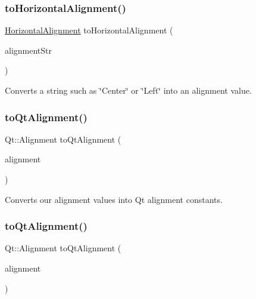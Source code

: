 \subsubsection{\texorpdfstring{to\+Horizontal\+Alignment()}{toHorizontalAlignment()}}
{\footnotesize\ttfamily \mbox{\hyperlink{namespacesgl_aa00e70829e72ff16addc4d9f06fe3bc5}{Horizontal\+Alignment}} to\+Horizontal\+Alignment (\begin{DoxyParamCaption}\item[{const std\+::string \&}]{alignment\+Str }\end{DoxyParamCaption})}



Converts a string such as \char`\"{}\+Center\char`\"{} or \char`\"{}\+Left\char`\"{} into an alignment value. 

\mbox{\label{namespacesgl_a4b99baed8860ed173f588839abaa54ef}} 
\subsubsection{\texorpdfstring{to\+Qt\+Alignment()}{toQtAlignment()}\hspace{0.1cm}{\footnotesize\ttfamily [1/2]}}
{\footnotesize\ttfamily Qt\+::\+Alignment to\+Qt\+Alignment (\begin{DoxyParamCaption}\item[{\mbox{\hyperlink{namespacesgl_aa00e70829e72ff16addc4d9f06fe3bc5}{Horizontal\+Alignment}}}]{alignment }\end{DoxyParamCaption})}



Converts our alignment values into Qt alignment constants. 

\mbox{\label{namespacesgl_a3f15703987d07a4fa579e2faf21f65fd}} 
\subsubsection{\texorpdfstring{to\+Qt\+Alignment()}{toQtAlignment()}\hspace{0.1cm}{\footnotesize\ttfamily [2/2]}}
{\footnotesize\ttfamily Qt\+::\+Alignment to\+Qt\+Alignment (\begin{DoxyParamCaption}\item[{\mbox{\hyperlink{namespacesgl_a9c2ed22cfbd21f13df24ea193b310aee}{Vertical\+Alignment}}}]{alignment }\end{DoxyParamCaption})}



